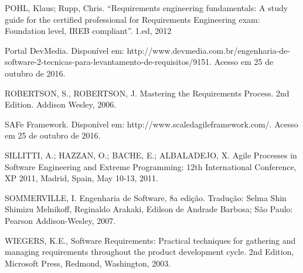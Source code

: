 POHL, Klaus; Rupp, Chris. “Requirements engineering fundamentals: A study guide for the certified professional for Requirements Engineering exam: Foundation level, IREB compliant”. 1.ed, 2012

Portal DevMedia. Disponível em: http://www.devmedia.com.br/engenharia-de-software-2-tecnicas-para-levantamento-de-requisitos/9151. Acesso em 25 de outubro de 2016.

ROBERTSON, S., ROBERTSON, J. Mastering the Requirements Process. 2nd Edition. Addison Wesley, 2006.

SAFe Framework. Disponível em: http://www.scaledagileframework.com/. Acesso em 25 de outubro de 2016.

SILLITTI, A.; HAZZAN, O.; BACHE, E.; ALBALADEJO, X. Agile Processes in Software Engineering and Extreme Programming: 12th International Conference, XP 2011, Madrid, Spain, May 10-13, 2011.

SOMMERVILLE, I. Engenharia de Software, 8a edição. Tradução: Selma Shin Shimizu Melnikoff, Reginaldo Arakaki, Edilson de Andrade Barbosa; São Paulo: Pearson Addison-Wesley, 2007.

WIEGERS, K.E., Software Requirements: Practical techniques for gathering and managing requirements throughout the product development cycle. 2nd Edition, Microsoft Press, Redmond, Washington, 2003. 




